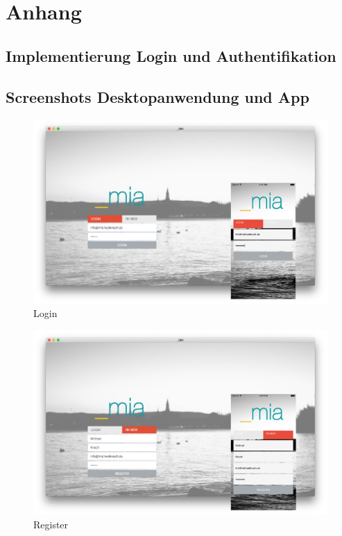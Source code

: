 
\appendix
\chapter{Anhang}
\section{Implementierung Login und Authentifikation}




\newpage
\section{Screenshots Desktopanwendung und App}
\label{screens}

\begin{figure}[htp]
 \centering
 \includegraphics[width=0.9\linewidth]{appendix/app/login.png}
 \caption{Login}
\end{figure}

\begin{figure}[htp]
 \centering
 \includegraphics[width=0.9\linewidth]{appendix/app/register.png}
 \caption{Register}
\end{figure}

